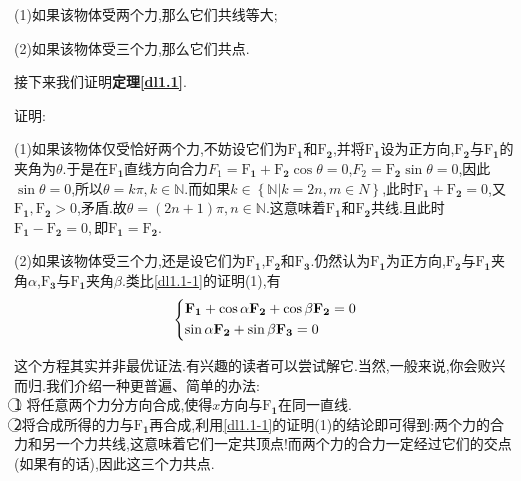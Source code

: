 (1)如果该物体受两个力,那么它们共线等大;


(2)如果该物体受三个力,那么它们共点.

接下来我们证明\textbf{定理\ref{dl1.1}}.


{ 证明:}


{\label{dl1.1-1} (1)如果该物体仅受恰好两个力,不妨设它们为$\boldsymbol{\mathrm{F}_1}$和$\boldsymbol{\mathrm{F}_2}$,并将$\boldsymbol{\mathrm{F}_1}$设为正方向,$\boldsymbol{\mathrm{F}_2}$与$\boldsymbol{\mathrm{F}_1}$的夹角为$\theta$.于是在$\boldsymbol{\mathrm{F}_1}$直线方向合力$F_1=\boldsymbol{\mathrm{F}_1}+\boldsymbol{\mathrm{F}_2}\cos\theta=0$,$F_2=\boldsymbol{\mathrm{F}_2}\sin\theta=0$,因此$\sin\theta=0$,所以$\theta=k\pi,k\in \mathbb{N}$.而如果$k\in \left\lbrace \mathbb{N}|k=2n,m\in N \right\rbrace $,此时$\boldsymbol{\mathrm{F}_1}+\boldsymbol{\mathrm{F}_2}=0$,又$\boldsymbol{\mathrm{F}_1},\boldsymbol{\mathrm{F}_2}>0$,矛盾.故$\theta=(2n+1)\pi,n\in\mathbb{N}.$这意味着$\boldsymbol{\mathrm{F}_1}$和$\boldsymbol{\mathrm{F}_2}$共线.且此时$\boldsymbol{\mathrm{F}_1}-\boldsymbol{\mathrm{F}_2}=0,$即$\boldsymbol{\mathrm{F}_1}=\boldsymbol{\mathrm{F}_2}$.}


{\label{dl1.1-2-1} (2)如果该物体受三个力,还是设它们为$\boldsymbol{\mathrm{F}_1}$,$\boldsymbol{\mathrm{F}_2}$和$\boldsymbol{\mathrm{F}_3}$.仍然认为$\boldsymbol{\mathrm{F}_1}$为正方向,$\boldsymbol{\mathrm{F}_2}$与$\boldsymbol{\mathrm{F}_1}$夹角$\alpha$,$\boldsymbol{\mathrm{F}_3}$与$\boldsymbol{\mathrm{F}_1}$夹角$\beta$.类比\ref{dl1.1-1}的证明(1),有}\\
\[
\left\{  \begin{lgathered}
	\boldsymbol{\mathrm{F}_1}+\cos\alpha\boldsymbol{\mathrm{F}_2}+\cos\beta\boldsymbol{\mathrm{F}_2}=0\\
	\sin\alpha\boldsymbol{\mathrm{F}_2}+\sin\beta\boldsymbol{\mathrm{F}_3}=0
	\end{lgathered} \right.
\]


{ 这个方程其实并非最优证法.有兴趣的读者可以尝试解它.当然,一般来说,你会败兴而归.我们介绍一种更普遍、简单的办法:\\\textcircled{1} 将任意两个力分方向合成,使得$x$方向与$\boldsymbol{\mathrm{F}_1}$在同一直线.\\\textcircled{2}将合成所得的力与$\boldsymbol{\mathrm{F}_1}$再合成,利用\ref{dl1.1-1}的证明(1)的结论即可得到:两个力的合力和另一个力共线,这意味着它们一定共顶点!而两个力的合力一定经过它们的交点(如果有的话),因此这三个力共点.}\\


